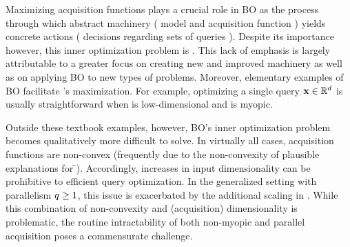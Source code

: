 

Maximizing acquisition functions plays a crucial role in BO as the process through which abstract machinery (\eg{} model \model{} and acquisition function \Acq) yields concrete actions (\eg{} decisions regarding sets of queries \X). 
% 
Despite its importance however, this inner optimization problem is . 
% 
This lack of emphasis is largely attributable to a greater focus on creating new and improved machinery as well as on applying BO to new types of problems. 
Moreover, elementary examples of BO facilitate \Acq's maximization.
% 
For example, optimizing a single query \(\mathbf{x} \in \mathbb{R}^{d}\) is usually straightforward when \x{} is low-dimensional and \Acq{} is myopic.


Outside these textbook examples, however, BO's inner optimization problem becomes qualitatively more difficult to solve. 
%
In virtually all cases, acquisition functions are non-convex (frequently due to the non-convexity of plausible explanations for \f{}).
% 
Accordingly, increases in input dimensionality \xdim{} can be prohibitive to efficient query optimization. In the generalized setting with parallelism \(q \ge 1\), this issue is exacerbated by the additional scaling in \parallelism. While this combination of non-convexity and (acquisition) dimensionality is problematic, the routine intractability of both non-myopic and parallel acquisition poses a commensurate challenge.


